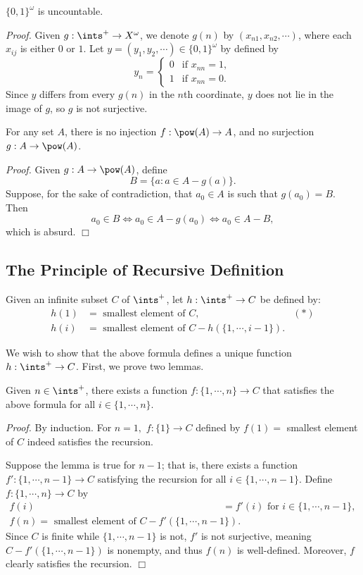 \begin{theorem}\label{1.24}
    $\{0, 1\}^\omega$ is uncountable.
\end{theorem}
{\it Proof.} Given $g: \ints^+ \rightarrow X^\omega$, we denote $g(n)$ by $(x_{n1}, x_{n2}, \cdots )$, where each $x_{ij}$ is either $0$ or $1$. Let $y = (y_1, y_2, \cdots) \in \{0, 1\}^\omega$ by defined by
$$y_n = \begin{cases}
    0 &\text{if } x_{nn} = 1, \\
    1 &\text{if } x_{nn} = 0.
\end{cases}$$
Since $y$ differs from every $g(n)$ in the $n$th coordinate, $y$ does not lie in the image of $g$, so $g$ is not surjective.

\begin{theorem}\label{1.25}
    For any set $A$, there is no injection $f: \pow (A) \rightarrow A$, and no surjection $g: A \rightarrow \pow (A)$.
\end{theorem}
{\it Proof.} Given $g: A \rightarrow \pow (A)$, define
$$B = \{a : a \in A-g(a)\}.$$
Suppose, for the sake of contradiction, that $a_0 \in A$ is such that $g(a_0) = B$. Then
$$a_0 \in B \iff a_0 \in A - g(a_0) \iff a_0 \in A - B,$$
which is absurd. $\Box$

\subsection{The Principle of Recursive Definition}
Given an infinite subset $C$ of $\ints^+$, let $h: \ints^+ \rightarrow C$ be defined by:
\begin{align*}
    h(1) &= \text{ smallest element of }C, &(*)\\
    h(i) &= \text{ smallest element of }C - h(\{1, \cdots, i-1\}).
\end{align*}

We wish to show that the above formula defines a unique function $h: \ints^+ \rightarrow C$. First, we prove two lemmas.
\begin{lemma}\label{1.26}
    Given $n \in \ints^+$, there exists a function $f: \{1, \cdots, n\} \rightarrow C$ that satisfies the above formula for all $i \in \{1, \cdots, n\}$.
\end{lemma}
{\it Proof.} By induction. For $n = 1,$ $f:\{1 \} \rightarrow C$ defined by $f(1) =$ smallest element of $C$ indeed satisfies the recursion.

Suppose the lemma is true for $n-1$; that is, there exists a function $f': \{1, \cdots, n-1\} \rightarrow C$ satisfying the recursion for all $i \in \{1, \cdots, n-1\}$. Define $f: \{1, \cdots, n\} \rightarrow C$ by
\begin{align*}
    f(i) &= f'(i) \text{ for } i \in \{1, \cdots, n-1\}, \\
    f(n) = \text{ smallest element of } C - f'(\{1, \cdots, n-1\}).
\end{align*}
Since $C$ is finite while $\{1, \cdots, n-1\}$ is not, $f'$ is not surjective, meaning $C - f'(\{1, \cdots, n-1\})$ is nonempty, and thus $f(n)$ is well-defined. Moreover, $f$ clearly satisfies the recursion. $\Box$

